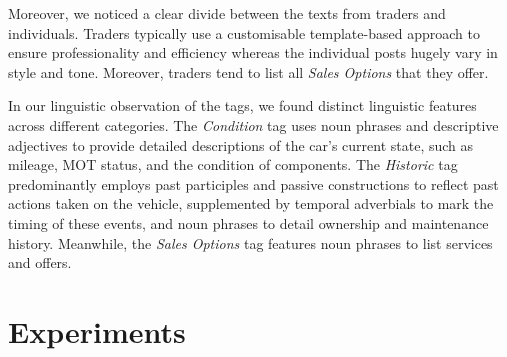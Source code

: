 \documentclass[11pt]{article}
\begin{document}
Moreover, we noticed a clear divide between the texts from traders and individuals. Traders typically use a customisable template-based approach to ensure professionality and efficiency whereas the individual posts hugely vary in style and tone. Moreover, traders tend to list all \textit{Sales Options} that they offer.



In our linguistic observation of the tags, we found distinct linguistic features across different categories. The \textit{Condition} tag uses noun phrases and descriptive adjectives to provide detailed descriptions of the car’s current state, such as mileage, MOT status, and the condition of components. The \textit{Historic} tag predominantly employs past participles and passive constructions to reflect past actions taken on the vehicle, supplemented by temporal adverbials to mark the timing of these events, and noun phrases to detail ownership and maintenance history. Meanwhile, the \textit{Sales Options} tag features noun phrases to list services and offers.




\section{Experiments}
\label{sec:exp}
\end{document}
